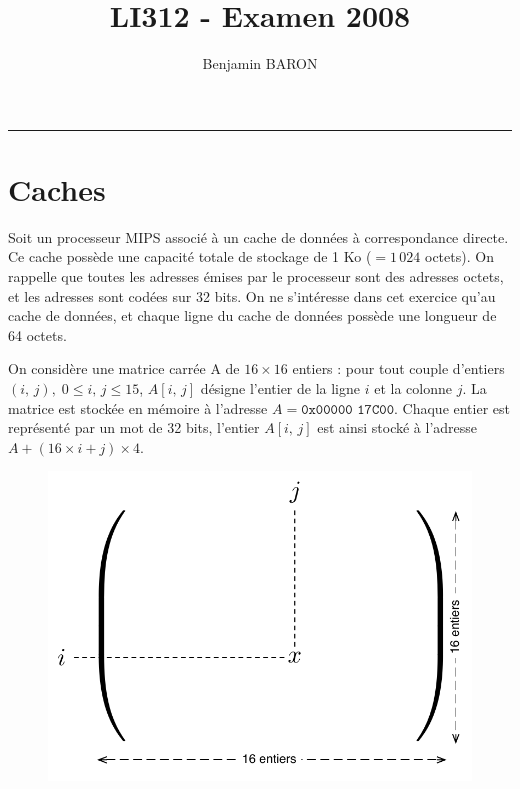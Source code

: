 \documentclass[11pt,english,french]{scrreprt}
\makeatletter
\theoremstyle{remark}
\theoremstyle{definition}
\renewcommand{\maketitle}{\begingroup%
    \let\footnotesize\small
    \let\footnoterule\relax
    \parindent \z@
    \reset@font
    \begin{flushleft}
      \huge \sffamily \bfseries\color{orange} \@title
    \end{flushleft}
    \hrule height 1pt
    \begin{flushright}
      \large\sffamily\color{MyDarkBlue}\@author
    \end{flushright}
  \endgroup%
  \setcounter{footnote}{0}%
}
\makeatother
\begin{document}
	
\title{LI312 - Examen 2008}
\author{Benjamin BARON}

\maketitle

\section{Caches} %

Soit un processeur MIPS associé à un cache de données à correspondance directe. Ce cache possède une capacité totale de stockage de 1 Ko ($=1\,024$ octets). On rappelle que toutes les adresses émises par le processeur sont des adresses octets, et les adresses sont codées sur 32 bits. On ne s'intéresse dans cet exercice qu'au cache de données, et chaque ligne du cache de données possède une longueur de 64 octets.

On considère une matrice carrée A de $16\times 16$ entiers : pour tout couple d'entiers $(i,\,j),\;0\leqslant i,\,j\leqslant 15$,  $A[i,\,j]$ désigne l'entier de la ligne $i$ et la colonne $j$. La matrice est stockée en mémoire à l'adresse $A=\texttt{0x00000 17C00}$. Chaque entier est représenté par un mot de 32 bits, l'entier $A[i,\,j]$ est ainsi stocké à l'adresse $A+(16\times i+j)\times4$.

\begin{figure}[h]
	\center
	\includegraphics[scale=.5]{diagrammes/matrice}
\end{figure}
\end{document}
